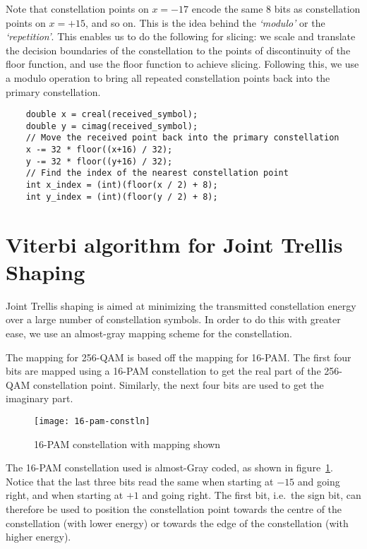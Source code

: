 Note that constellation points on $x=-17$ encode the same 8 bits as
constellation points on $x=+15$, and so on. This is the idea behind the
\emph{`modulo'} or the \emph{`repetition'}. This enables us to do the following
for slicing: we scale and translate the decision boundaries of the
constellation to the points of discontinuity of the floor function, and use the
floor function to achieve slicing. Following this, we use a modulo operation to
bring all repeated constellation points back into the primary constellation.

\begin{lstlisting}
	double x = creal(received_symbol);
	double y = cimag(received_symbol);
	// Move the received point back into the primary constellation
	x -= 32 * floor((x+16) / 32);
	y -= 32 * floor((y+16) / 32);
	// Find the index of the nearest constellation point
	int x_index = (int)(floor(x / 2) + 8);
	int y_index = (int)(floor(y / 2) + 8);
\end{lstlisting}


\section{Viterbi algorithm for Joint Trellis Shaping}

Joint Trellis shaping is aimed at minimizing the transmitted constellation
energy over a large number of constellation symbols. In order to do this with
greater ease, we use an almost-gray mapping scheme for the constellation.

The mapping for 256-QAM is based off the mapping for 16-PAM. The first four
bits are mapped using a 16-PAM constellation to get the real part of the
256-QAM constellation point. Similarly, the next four bits are used to get the
imaginary part.

\begin{figure}[h]
	\centering
	\texttt{[image: 16-pam-constln]}
	\caption{16-PAM constellation with mapping shown}
	\label{fig:16-pam}
\end{figure}

The 16-PAM constellation used is almost-Gray coded, as shown in
figure~\ref{fig:16-pam}. Notice that the last three bits read the same when
starting at $-15$ and going right, and when starting at $+1$ and going right.
The first bit, i.e.\ the sign bit, can therefore be used to position the
constellation point towards the centre of the constellation (with lower energy)
or towards the edge of the constellation (with higher energy).


